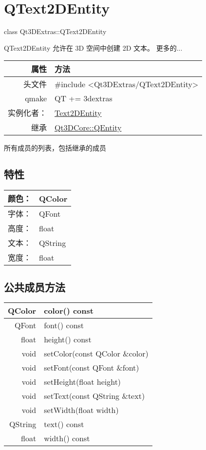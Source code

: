 \chapter{QText2DEntity}

class Qt3DExtras::QText2DEntity

QText2DEntity 允许在 3D 空间中创建 2D 文本。 更多的...

\begin{tabular}{|r|l|}
	\hline
	属性 & 方法 \\
	\hline
	头文件 & \#include <Qt3DExtras/QText2DEntity>\\      
	\hline
	qmake & QT += 3dextras\\     
	\hline
	实例化者：&	\href{https://gitee.com/wcc210/QtDocumentCN/blob/master/Src/T/QText2DEntity/Text2DEntity.md#}{Text2DEntity} \\  
	\hline
	继承	  &  \href{https://gitee.com/wcc210/QtDocumentCN/blob/master/Src/T/QText2DEntity/Qt3DCore.md#}{Qt3DCore::QEntity}  \\ 
	\hline
\end{tabular}

所有成员的列表，包括继承的成员

\section{特性}

\begin{tabular}{|r|l|}
	\hline
	颜色： &	QColor \\ 
	\hline
	字体：&	QFont \\ 
	\hline
	高度：	&float \\
	\hline
	文本：	&QString \\ 
	\hline
	宽度：&	float \\
	\hline
\end{tabular}



\section{公共成员方法}

\begin{tabular}{|r|l|}
\hline
QColor &	color() const \\
\hline
QFont	&font() const\\
\hline
float	&height() const\\
\hline
void&	setColor(const QColor \&color)\\
\hline
void&	setFont(const QFont \&font) \\
\hline
void&	setHeight(float height) \\
\hline
void&	setText(const QString \&text)\\
\hline
void&	setWidth(float width)\\
\hline
QString	&text() const\\
\hline
float &	width() const \\
\hline
\end{tabular}


